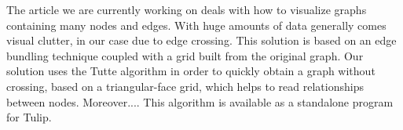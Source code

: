 The article we are currently working on deals with how to visualize graphs containing many nodes and edges. With huge amounts of data generally comes visual clutter, in our case due to edge crossing. This solution is based on an edge bundling technique coupled with a grid built from the original graph. Our solution uses the Tutte algorithm in order to quickly obtain a graph without crossing, based on a triangular-face grid, which helps to read relationships between nodes. Moreover.... This algorithm is available as a standalone program for Tulip. 
